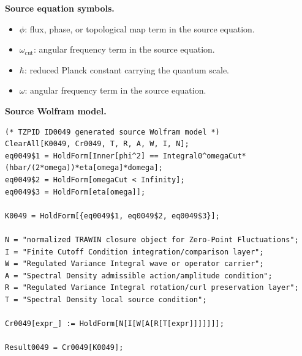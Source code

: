 \begin{minipage}[t]{0.49\linewidth}
\begingroup
\small
\raggedright
\textbf{Source equation symbols.}\par
\begin{itemize}[leftmargin=1.35em,itemsep=1pt,topsep=1pt,parsep=0pt]
    \item $\phi$: flux, phase, or topological map term in the source equation.
    \item $\omega_{\mathrm{cut}}$: angular frequency term in the source equation.
    \item $\hbar$: reduced Planck constant carrying the quantum scale.
    \item $\omega$: angular frequency term in the source equation.
\end{itemize}
\endgroup
\end{minipage}\hfill
\begin{minipage}[t]{0.47\linewidth}
\begingroup
\scriptsize
\raggedright
\textbf{Source Wolfram model.}\par
\begin{Verbatim}[fontsize=\tiny,breaklines=true,breakanywhere=true]
(* TZPID ID0049 generated source Wolfram model *)
ClearAll[K0049, Cr0049, T, R, A, W, I, N];
eq0049$1 = HoldForm[Inner[phi^2] == Integral0^omegaCut*(hbar/(2*omega))*eta[omega]*domega];
eq0049$2 = HoldForm[omegaCut < Infinity];
eq0049$3 = HoldForm[eta[omega]];

K0049 = HoldForm[{eq0049$1, eq0049$2, eq0049$3}];

N = "normalized TRAWIN closure object for Zero-Point Fluctuations";
I = "Finite Cutoff Condition integration/comparison layer";
W = "Regulated Variance Integral wave or operator carrier";
A = "Spectral Density admissible action/amplitude condition";
R = "Regulated Variance Integral rotation/curl preservation layer";
T = "Spectral Density local source condition";

Cr0049[expr_] := HoldForm[N[I[W[A[R[T[expr]]]]]]];

Result0049 = Cr0049[K0049];
\end{Verbatim}
\endgroup
\end{minipage}

